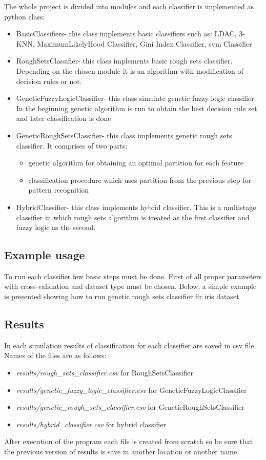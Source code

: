 The whole project is divided into modules and each classifier is implemented as
python class:
\begin{itemize}
    \item BasicClassifiers- this class implements basic classifiers such as:
        LDAC, 3-KNN, MaximumLikelyHood Classifier, Gini Index Classifier, svm
        Classifier
    \item RoughSetsClassifier- this class implements basic rough sets
        classifier. Depending on the chosen module it is an algorithm with
        modification of decision rules or not.
    \item GeneticFuzzyLogicClassifier- this class simulate genetic fuzzy logic
        classifier. In the beginning genetic algorithm is run to obtain the
        best decision rule set and later classification is done
    \item GeneticRoughSetsClassifier- this class implements genetic rough sets
        classifier. It comprises of two parts:
        \begin{itemize}
            \item genetic algorithm for obtaining an optimal partition for each
                feature
            \item classification procedure which uses partition from the
                previous step for pattern recognition
        \end{itemize}
    \item HybridClassifier- this class implements hybrid classifier. This is a
        multistage classifier in which rough sets algorithm is treated as the
        first classifier and fuzzy logic as the second.
\end{itemize}
\subsection{Example usage}
To run each classifier few basic steps must be done. First of all proper
parameters with cross-validation and dataset type must be chosen. Below, a
simple example is presented showing how to run genetic rough sets classifier
fir iris dataset

\subsection{Results}
In each simulation results of classification for each classifier are saved in
csv file. Names of the files are as follows:
\begin{itemize}
    \item \textit{results/rough\_sets\_classifier.csv} for RoughSetsClassifier
    \item \textit{results/genetic\_fuzzy\_logic\_classifier.csv} for GeneticFuzzyLogicClassifier
    \item \textit{results/genetic\_rough\_sets\_classifier.csv} for GeneticRoughSetsClassifier
    \item \textit{results/hybrid\_classifier.csv} for hybrid classifier
\end{itemize}
After execution of the program each file is created from scratch so be sure
that the previous version of results is save in another location or another
name.

